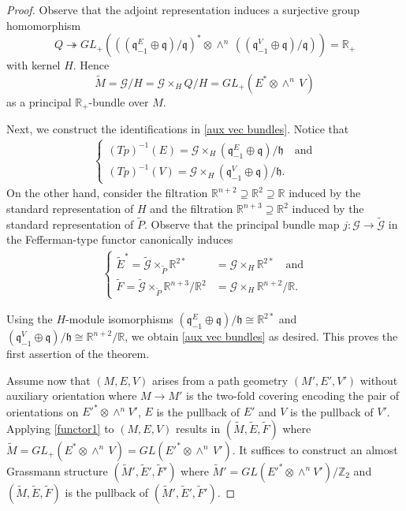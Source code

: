 \documentclass[11pt]{amsart}
\begin{document}
\begin{proof}
Observe that the adjoint representation induces a surjective group homomorphism
\[Q\twoheadrightarrow GL_+\left(\left((\mathfrak q_{-1}^E\oplus\mathfrak q)/\mathfrak q\right)^*\otimes\wedge^n\,\left((\mathfrak q_{-1}^V\oplus\mathfrak q)/\mathfrak q\right)\right)=\mathbb R_+\]
with kernel $H$. Hence 
\[\tilde M=\mathcal G/H=\mathcal G\times_HQ/H= GL_+(E^*\otimes\wedge^n\,V)\]
as a principal $\mathbb R_+$-bundle over $M$.

Next, we construct the identifications in \eqref{aux vec bundles}. Notice that
\begin{equation}\label{lifts of E and V}
\begin{aligned}
\begin{cases}
    (Tp)^{-1}(E)=\mathcal G\times_H (\mathfrak q_{-1}^E\oplus\mathfrak q)/\mathfrak h\quad\text{and}\\
    (Tp)^{-1}(V)=\mathcal G\times_H(\mathfrak q_{-1}^V\oplus\mathfrak q)/\mathfrak h.
\end{cases}
\end{aligned}
\end{equation}
On the other hand, consider the filtration $\mathbb R^{n+2}\supseteq\mathbb R^2\supseteq\mathbb R$ induced by the standard representation of $H$ and the filtration $\mathbb R^{n+3}\supseteq\mathbb R^2$ induced by the standard representation of $\tilde P$. Observe that the principal bundle map $j:\mathcal G\to\tilde{\mathcal G}$ in the Fefferman-type functor canonically induces
\begin{equation}\label{assoc H bundles}
\begin{aligned}
\begin{cases}
\tilde E^*=\tilde{\mathcal G}\times_{\tilde P}\mathbb R^{2*}&=\mathcal G\times_H\mathbb R^{2*}
    \quad\text{and}\\
\tilde F=\tilde{\mathcal G}\times_{\tilde P}\mathbb R^{n+3}/\mathbb R^2&=\mathcal G\times_H\mathbb R^{n+2}/\mathbb R.    
\end{cases}
\end{aligned}
\end{equation}


Using the $H$-module isomorphisms $(\mathfrak q_{-1}^E\oplus\mathfrak q)/\mathfrak h\cong\mathbb R^{2*}$ and
$(\mathfrak q_{-1}^V\oplus\mathfrak q)/\mathfrak h\cong\mathbb R^{n+2}/\mathbb R$, we obtain \eqref{aux vec bundles} as desired. This proves the first assertion of the theorem.

Assume now that $(M,E,V)$ arises from a path geometry $(M',E',V')$ without auxiliary orientation where $M\to M'$ is the two-fold covering encoding the pair of orientations on $E'^{*}\otimes\wedge^nV'$, $E$ is the pullback of $E'$ and $V$ is the pullback of $V'$. Applying \eqref{functor1} to $(M,E,V)$ results in $(\tilde M,\tilde E,\tilde F)$ where $\tilde M=GL_+(E^*\otimes\wedge^n\,V)=GL(E'^*\otimes\wedge^n\,V')$. It suffices to construct an almost Grassmann structure $(\tilde M',\tilde E',\tilde F')$ where $\tilde M'=GL(E'^{*}\otimes\wedge^nV')/\mathbb Z_2$ and $(\tilde M,\tilde E,\tilde F)$ is the pullback of $(\tilde M',\tilde E',\tilde F')$.


\end{proof}
\end{document}
